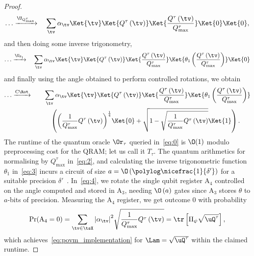 \begin{proof}
\begin{align}
    \ldots\xrightarrow{ \U_{Q_{\max}^{\tau}} }\quad\sum_{\tv}\alpha_{\tv}\Ket{\tv}\Ket{Q^{\tau}\left(\tv\right)}\Ket{\frac{Q^{\tau}\left(\tv\right)}{Q_{\max}^{\tau}}}\Ket{0}\Ket{0},
  \end{align}
  and then doing some inverse trigonometry,
  \begin{align}
    \label{eq:3}
    \ldots\xrightarrow{ \U_{\theta_1} }\quad\sum_{\tv}\alpha_{\tv}\Ket{\tv}\Ket{Q^{\tau}\left(\tv\right)}\Ket{\frac{Q^{\tau}\left(\tv\right)}{Q_{\max}^{\tau}}}\Ket{\theta_1\left(\frac{Q^{\tau}\left(\tv\right)}{Q_{\max}^{\tau}}\right)}\Ket{0}
  \end{align}
  and finally using the angle obtained to perform controlled rotations, we obtain
  \begin{align}
    \label{eq:4}
    \ldots\xrightarrow{ \mathrm{C}\Rot }\quad&\quad\sum_{\tv}\alpha_{\tv}\Ket{\tv}\Ket{Q^{\tau}\left(\tv\right)}\Ket{\frac{Q^{\tau}\left(\tv\right)}{Q_{\max}^{\tau}}}\Ket{\theta_1\left(\frac{Q^{\tau}\left(\tv\right)}{Q_{\max}^{\tau}}\right)}\nonumber\\
                                    &\quad\quad\left({\left(\frac{1}{Q_{\max}^{\tau}}Q^{\tau}\left(\tv\right)\right)}^{\frac{1}{4}}\Ket{0}+\sqrt{1-\sqrt{\frac{1}{Q_{\max}^{\tau}}Q^{\tau}\left(\tv\right)}}\Ket{1}\right).
  \end{align}
  The runtime of the quantum oracle $\Or_\tau$ queried in~\cref{eq:0} is $\O(1)$ modulo preprocessing cost for the QRAM; let us call it $T_\tau$. The quantum arithmetics for normalising by $Q_{\max}^{\tau}$ in~\cref{eq:2}, and calculating the inverse trigonometric function $\theta_1$ in~\cref{eq:3} incurs a circuit of size $a=\O\left(\polylog\nicefrac{1}{\delta'}\right)$ for a suitable precision $\delta'$~\cite{haner2018}.
  In~\cref{eq:4}, we rotate the single qubit register A$_4$ controlled on the angle computed and stored in A$_3$,
  needing $\O\left(a\right)$ gates since A$_3$ stores $\theta$ to $a$-bits of precision.
  Measuring the A$_4$ register, we get outcome $0$ with probability
  \begin{equation}
    \label{eq:probability_sqrt_q_tau}
    \Pr(\text{A}_4=0)=\sum_{\tv\in\tsX}{\left|\alpha_{\tv}\right|}^2 \sqrt{\frac{1}{Q_{\max}^{\tau}}Q^{\tau}\left(\tv\right)}=\tr\left[\Pi_{\psi}\sqrt{\uQ^{\tau}}\right],
  \end{equation}
  which achieves~\cref{eq:povm_implementation} for $\Lam=\sqrt{\uQ^{\tau}}$ within the claimed runtime.
\end{proof}

